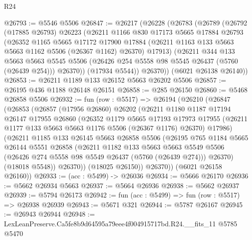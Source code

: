 \begin{lexlean}{R24}
\begin{coremodule}
@26793 := @5546 @5506
@26847 := @26217
    (@26228
      (@26783
        (@26789
          (@26792
            (@17885 @26793)
            @26223
            (@26211
              @1166
              @830
              @17173
              @5665
              @17884
              @26793
              (@26352
                @1165
                @5665
                @17172
                @17900
                @17884
                (@26211 @1163 @133 @5663 @5663 @1162 @5506 (@26367 @1162) @26370)
                @17913)
              (@26211
                @344
                @133
                @5663
                @5663
                @5545
                @5506
                (@26426 @254 @5558 @98 @5545 @26437 (@5760 (@26439 @254)))
                @26370))
            (@17934 @5544))
          @26370))
      (@6021 @26138 @26140))
@26853 := @26211 @1189 @133 @26152 @5663 @26202 @5506
@26857 := @26195 @436 @1188 @26148 @26151
@26858 := @285 @26150
@26860 := @5468 @26858 @5506
@26932 := fun (row : @5517) =>
  @26194
    (@26210
      (@26847
        (@26853
          (@26857
            (@17956 @26860)
            @26202
            (@26211
              @1180
              @1187
              @17194
              @26147
              @17955
              @26860
              (@26352
                @1179
                @5665
                @17193
                @17973
                @17955
                (@26211 @1177 @133 @5663 @5663 @1176 @5506 (@26367 @1176) @26370)
                @17986)
              (@26211
                @1185
                @133
                @26145
                @5663
                @26858
                @5506
                (@26195
                  @765
                  @1184
                  @5665
                  @26144
                  @5551
                  @26858
                  (@26211
                    @1182
                    @133
                    @5663
                    @5663
                    @5549
                    @5506
                    (@26426 @274 @5558 @98 @5549 @26437 (@5760 (@26439 @274)))
                    @26370)
                  (@18018 @5548))
                @26370))
            (@18025 @26150))
          @26370))
      (@6021 @26158 @26160))
@26933 := (acc : @5499) -> @26036
@26934 := @5666 @26170
@26936 := @5662 @26934 @5663
@26937 := @5664 @26936
@26938 := @5662 @26937
@26939 := @5794 @26173
@26942 := fun (acc : @5499) => fun (row : @5517) => @26938 @26939
@26943 := @5671 @321
@26944 := @5787 @26167
@26945 := @26943 @26944
@26948 := LexLeanPreserve.Ca5fe8b9d64595a79eee4f004915717bd.R24.__fits_11 @5785 @5470

\end{coremodule}
\end{lexlean}

